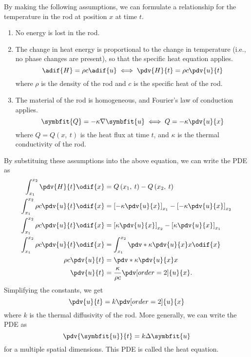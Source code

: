 \documentclass{article}
\begin{document}
By making the following assumptions, we can formulate a relationship for the temperature in the rod at position \(x\) at time \(t\).
\begin{enumerate}
    \item No energy is lost in the rod.
    \item The change in heat energy is proportional to the change in temperature (i.e., no phase changes are present), so that the specific heat equation applies.
          \begin{equation*}
              \adif{H} = \rho c \adif{u} \iff \pdv{H}{t} = \rho c \pdv{u}{t}
          \end{equation*}
          where \(\rho\) is the density of the rod and \(c\) is the specific heat of the rod.
    \item The material of the rod is homogeneous, and Fourier's law of conduction applies.
          \begin{equation*}
              \symbfit{Q} = -\kappa \nabla \symbfit{u} \iff Q = -\kappa \pdv{u}{x}
          \end{equation*}
          where \(Q = Q\left( x,\: t \right)\) is the heat flux at time \(t\), and \(\kappa\) is the thermal conductivity of the rod.
\end{enumerate}
By substituing these assumptions into the above equation, we can write the PDE as
\begin{align*}
    \int_{x_1}^{x_2} \pdv{H}{t} \odif{x}        & = Q\left( x_1,\: t \right) - Q\left( x_2,\: t \right)                               \\
    \int_{x_1}^{x_2} \rho c \pdv{u}{t} \odif{x} & = \left[ -\kappa \pdv{u}{x} \right]_{x_1} - \left[ -\kappa \pdv{u}{x} \right]_{x_2} \\
    \int_{x_1}^{x_2} \rho c \pdv{u}{t} \odif{x} & = \left[ \kappa \pdv{u}{x} \right]_{x_2} - \left[ \kappa \pdv{u}{x} \right]_{x_1}   \\
    \int_{x_1}^{x_2} \rho c \pdv{u}{t} \odif{x} & = \int_{x_1}^{x_2} \pdv*{\kappa \pdv{u}{x}}{x} \odif{x}                             \\
    \rho c \pdv{u}{t}                           & = \pdv*{\kappa \pdv{u}{x}}{x}                                                       \\
    \pdv{u}{t}                                  & = \frac{\kappa}{\rho c} \pdv[order=2]{u}{x}.
\end{align*}
Simplifying the constants, we get
\begin{equation*}
    \pdv{u}{t} = k\pdv[order=2]{u}{x}
\end{equation*}
where \(k\) is the thermal diffusivity of the rod. More generally, we can write the PDE as
\begin{equation*}
    \pdv{\symbfit{u}}{t} = k \Delta{\symbfit{u}}
\end{equation*}
for a multiple spatial dimensions. This PDE is called the heat equation.
\end{document}
